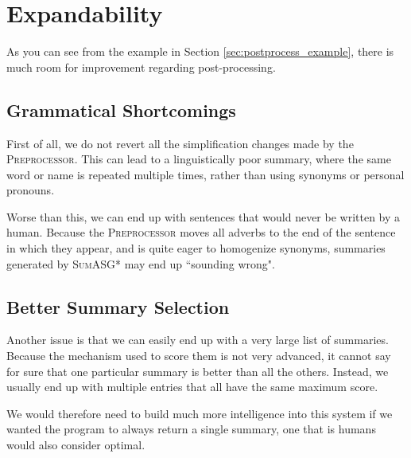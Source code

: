 \section{Expandability}

As you can see from the example in Section \ref{sec:postprocess_example}, there is much room for improvement regarding post-processing.

\subsection{Grammatical Shortcomings}

First of all, we do not revert all the simplification changes made by the \textsc{Preprocessor}. This can lead to a linguistically poor summary, where the same word or name is repeated multiple times, rather than using synonyms or personal pronouns.

Worse than this, we can end up with sentences that would never be written by a human. Because the \textsc{Preprocessor} moves all adverbs to the end of the sentence in which they appear, and is quite eager to homogenize synonyms, summaries generated by \textsc{SumASG*} may end up ``sounding wrong".

\subsection{Better Summary Selection}

Another issue is that we can easily end up with a very large list of summaries. Because the mechanism used to score them is not very advanced, it cannot say for sure that one particular summary is better than all the others. Instead, we usually end up with multiple entries that all have the same maximum score.

We would therefore need to build much more intelligence into this system if we wanted the program to always return a single summary, one that is humans would also consider optimal.